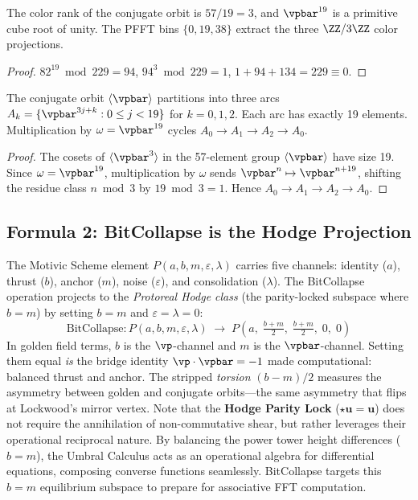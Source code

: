 \begin{theorem}\label{thm:color_proj}
The color rank of the conjugate orbit is $57 / 19 = 3$, and $\vpbar^{19}$ is a primitive cube root of unity. The PFFT bins $\{0, 19, 38\}$ extract the three $\ZZ/3\ZZ$ color projections.
\end{theorem}

\begin{proof}
$82^{19} \bmod 229 = 94$, $94^3 \bmod 229 = 1$, $1 + 94 + 134 = 229 \equiv 0$. \qedhere
\end{proof}

\begin{proposition}\label{prop:arcs}
The conjugate orbit $\langle \vpbar \rangle$ partitions into three arcs $A_k = \{\vpbar^{3j+k} : 0 \leq j < 19\}$ for $k = 0, 1, 2$. Each arc has exactly 19 elements. Multiplication by $\omega = \vpbar^{19}$ cycles $A_0 \to A_1 \to A_2 \to A_0$.
\end{proposition}

\begin{proof}
The cosets of $\langle \vpbar^3 \rangle$ in the 57-element group $\langle \vpbar \rangle$ have size 19. Since $\omega = \vpbar^{19}$, multiplication by $\omega$ sends $\vpbar^n \mapsto \vpbar^{n+19}$, shifting the residue class $n \bmod 3$ by $19 \bmod 3 = 1$. Hence $A_0 \to A_1 \to A_2 \to A_0$. \qedhere
\end{proof}

\subsection{Formula 2: BitCollapse is the Hodge Projection}

The Motivic Scheme element $P(a, b, m, \varepsilon, \lambda)$ carries five channels: identity ($a$), thrust ($b$), anchor ($m$), noise ($\varepsilon$), and consolidation ($\lambda$). The BitCollapse operation projects to the \emph{Protoreal Hodge class} (the parity-locked subspace where $b = m$) by setting $b = m$ and $\varepsilon = \lambda = 0$:
\[
\mathrm{BitCollapse}: P(a, b, m, \varepsilon, \lambda) \;\longrightarrow\; P\!\left(a,\; \tfrac{b+m}{2},\; \tfrac{b+m}{2},\; 0,\; 0\right)
\]
In golden field terms, $b$ is the $\vp$-channel and $m$ is the $\vpbar$-channel. Setting them equal \emph{is} the bridge identity $\vp \cdot \vpbar = -1$ made computational: balanced thrust and anchor. The stripped \emph{torsion} $(b - m)/2$ measures the asymmetry between golden and conjugate orbits---the same asymmetry that flips at Lockwood's mirror vertex. Note that the \textbf{Hodge Parity Lock} ($\star \mathbf{u} = \mathbf{u}$) does not require the annihilation of non-commutative shear, but rather leverages their operational reciprocal nature. By balancing the power tower height differences ($b = m$), the Umbral Calculus acts as an operational algebra for differential equations, composing converse functions seamlessly. BitCollapse targets this $b=m$ equilibrium subspace to prepare for associative FFT computation.

